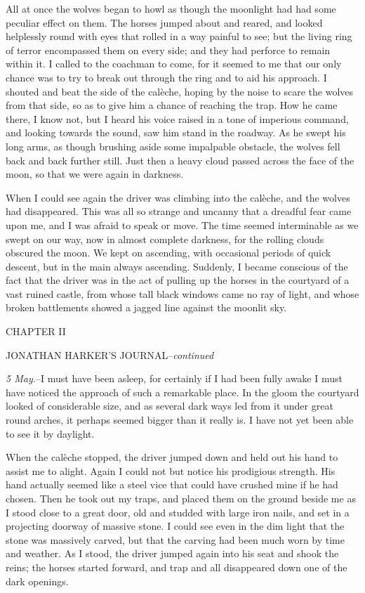 \documentclass[12pt,openright]{book}
\begin{document}
All at once the wolves began to howl as though the moonlight had had some peculiar effect on them. The horses jumped about and reared, and looked helplessly round with eyes that rolled in a way painful to see; but the living ring of terror encompassed them on every side; and they had perforce to remain within it. I called to the coachman to come, for it seemed to me that our only chance was to try to break out through the ring and to aid his approach. I shouted and beat the side of the calèche, hoping by the noise to scare the wolves from that side, so as to give him a chance of reaching the trap. How he came there, I know not, but I heard his voice raised in a tone of imperious command, and looking towards the sound, saw him stand in the roadway. As he swept his long arms, as though brushing aside some impalpable obstacle, the wolves fell back and back further still. Just then a heavy cloud passed across the face of the moon, so that we were again in darkness.

When I could see again the driver was climbing into the calèche, and the wolves had disappeared. This was all so strange and uncanny that a dreadful fear came upon me, and I was afraid to speak or move. The time seemed interminable as we swept on our way, now in almost complete darkness, for the rolling clouds obscured the moon. We kept on ascending, with occasional periods of quick descent, but in the main always ascending. Suddenly, I became conscious of the fact that the driver was in the act of pulling up the horses in the courtyard of a vast ruined castle, from whose tall black windows came no ray of light, and whose broken battlements showed a jagged line against the moonlit sky.

CHAPTER II

JONATHAN HARKER’S JOURNAL–\textit{continued}

\textit{5 May.}–I must have been asleep, for certainly if I had been fully awake I must have noticed the approach of such a remarkable place. In the gloom the courtyard looked of considerable size, and as several dark ways led from it under great round arches, it perhaps seemed bigger than it really is. I have not yet been able to see it by daylight.

When the calèche stopped, the driver jumped down and held out his hand to assist me to alight. Again I could not but notice his prodigious strength. His hand actually seemed like a steel vice that could have crushed mine if he had chosen. Then he took out my traps, and placed them on the ground beside me as I stood close to a great door, old and studded with large iron nails, and set in a projecting doorway of massive stone. I could see even in the dim light that the stone was massively carved, but that the carving had been much worn by time and weather. As I stood, the driver jumped again into his seat and shook the reins; the horses started forward, and trap and all disappeared down one of the dark openings.
\end{document}
